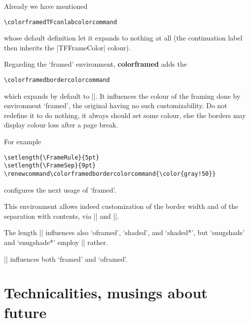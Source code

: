 \documentclass[a4paper,dvipdfmx,10pt,english]{article}
\def\colorframedTFconlabcolorcommand{\color{purple}}
\def\colorframedbordercolorcommand{\color{red!20}}
\def\ctanpackage#1{\href{https://ctan.org/pkg/#1}{#1}}
\newcommand\colorframed{%
        \texorpdfstring{{\color{joli}\bfseries colorframed}}{colorframed}\xspace}
\begin{document}

Already we have mentioned
\begin{verbatim}
\colorframedTFconlabcolorcommand
\end{verbatim}
whose default definition let it expands to nothing at all (the continuation label
then inherits the |TFFrameColor| colour).

Regarding the `framed' environment, \colorframed adds the
\begin{verbatim}
\colorframedbordercolorcommand
\end{verbatim}
which expands by default to |\normalcolor|.  It influences the colour of the
framing done by environment `framed', the original having no such
customizability.  Do not redefine it to do nothing, it always should set some
colour, else the borders may display colour loss after a page break.

For example
\begin{verbatim}
\setlength{\FrameRule}{5pt}
\setlength{\FrameSep}{9pt}
\renewcommand\colorframedbordercolorcommand{\color{gray!50}}
\end{verbatim}
configures the next usage of `framed'.

\setlength{\FrameRule}{5pt}
\setlength{\FrameSep}{9pt}
\renewcommand\colorframedbordercolorcommand{\color{gray!50}}
\begin{framed}
  This environment allows indeed customization of the border width
  and of the separation with contents, via |\FrameRule| and
  |\FrameSep|.

  The length |\FrameSep| influences also `oframed', `shaded', and `shaded*',
  but `snugshade' and `snugshade*' employ |\fboxsep| rather.

  |\FrameRule| influences both `framed' and `oframed'.
\end{framed}

\section{Technicalities, musings about future}
\end{document}
